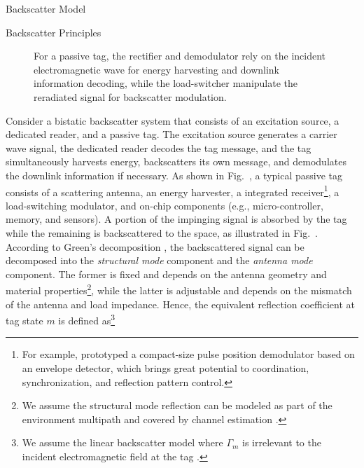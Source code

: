 \documentclass[journal]{IEEEtran}
\begin{document}
\begin{section}{Backscatter Model}
\begin{subsection}{Backscatter Principles}
\begin{figure}[!t]
{					\label{fi:block_diagram}
				}
				\caption{For a passive tag, the rectifier and demodulator rely on the incident electromagnetic wave for energy harvesting and downlink information decoding, while the load-switcher manipulate the reradiated signal for backscatter modulation.}
				\label{fi:tag}
			\end{figure}
			Consider a bistatic backscatter system that consists of an excitation source, a dedicated reader, and a passive tag. The excitation source generates a carrier wave signal, the dedicated reader decodes the tag message, and the tag simultaneously harvests energy, backscatters its own message, and demodulates the downlink information if necessary. As shown in Fig.~, a typical passive tag consists of a scattering antenna, an energy harvester, a integrated receiver\footnote{For example, \cite{Kim2021a} prototyped a compact-size pulse position demodulator based on an envelope detector, which brings great potential to coordination, synchronization, and reflection pattern control.}, a load-switching modulator, and on-chip components (e.g., micro-controller, memory, and sensors). A portion of the impinging signal is absorbed by the tag while the remaining is backscattered to the space, as illustrated in Fig.~. According to Green's decomposition \cite{Hansen1989}, the backscattered signal can be decomposed into the \emph{structural mode} component and the \emph{antenna mode} component. The former is fixed and depends on the antenna geometry and material properties\footnote{We assume the structural mode reflection can be modeled as part of the environment multipath and covered by channel estimation \cite{Boyer2014}.}, while the latter is adjustable and depends on the mismatch of the antenna and load impedance. Hence, the equivalent reflection coefficient at tag state $m$ is defined as\footnote{We assume the linear backscatter model where $\Gamma_m$ is irrelevant to the incident electromagnetic field at the tag \cite{Dobkin2012}.}

\end{subsection}
\end{section}
\end{document}
